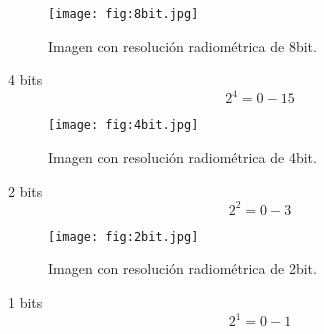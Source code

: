 
\begin{frame}{}
  \begin{figure}
    \centering
    \texttt{[image: fig:8bit.jpg]}
    \caption{Imagen con resolución radiométrica de 8bit.}
    \label{}
  \end{figure}
\end{frame}


\begin{frame}{}
  \begin{block}{4 bits}
   \begin{equation}
            2^4 = 0-15
        \end{equation}
  \end{block}
\end{frame}


\begin{frame}{}
  \begin{figure}
    \centering
    \texttt{[image: fig:4bit.jpg]}
    \caption{Imagen con resolución radiométrica de 4bit.}
    \label{}
  \end{figure}
\end{frame}


\begin{frame}{}
  \begin{block}{2 bits}
   \begin{equation}
            2^2 = 0-3
        \end{equation}
  \end{block}
\end{frame}


\begin{frame}{}
  \begin{figure}
    \centering
    \texttt{[image: fig:2bit.jpg]}
    \caption{Imagen con resolución radiométrica de 2bit.}
    \label{}
  \end{figure}
\end{frame}




\begin{frame}{}
  \begin{block}{1 bits}
   \begin{equation}
            2^1 = 0-1
        \end{equation}
  \end{block}
\end{frame}

